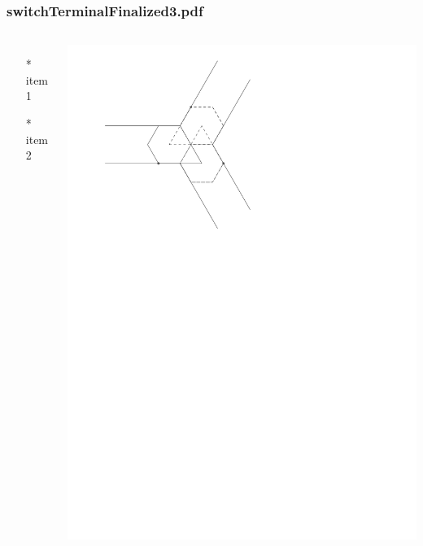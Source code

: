 \begin{frame} \frametitle{switchTerminalFinalized3.pdf}
    \begin{columns}[c]
        \begin{itemize}
            \item[*] item 1
            \item[*] item 2
        \end{itemize}
        \begin{minipage}{\linewidth}
            \begin{center}
            \includegraphics[width=.9\textwidth]{graphics/switchTerminalFinalized3.pdf}
            \label{gfx:switchTerminalFinalized3.pdf}
            \end{center}
        \end{minipage}
    \end{columns}
\end{frame}
